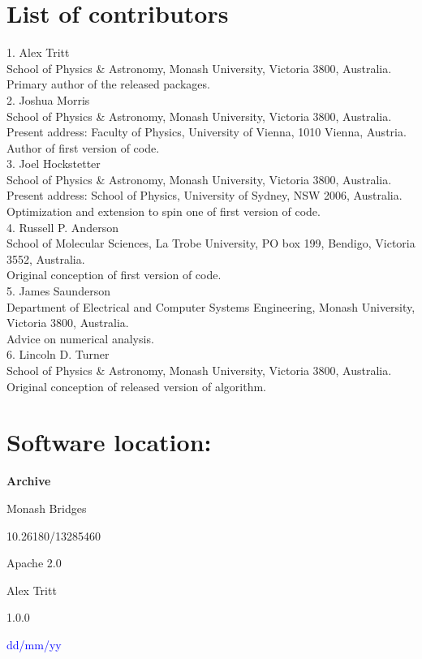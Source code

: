 \documentclass{jors}
\begin{document}
\section{List of contributors}

1. Alex Tritt\\
	School of Physics \& Astronomy, Monash University, Victoria 3800, Australia.\\
	Primary author of the released packages.\\
2. Joshua Morris\\
	School of Physics \& Astronomy, Monash University, Victoria 3800, Australia.\\
	Present address: Faculty of Physics, University of Vienna, 1010 Vienna, Austria.\\
	Author of first version of code.\\
3. Joel Hockstetter\\
	School of Physics \& Astronomy, Monash University, Victoria 3800, Australia.\\
	Present address: School of Physics, University of Sydney, NSW 2006, Australia.\\
	Optimization and extension to spin one of first version of code.\\
4. Russell P. Anderson\\
	School of Molecular Sciences, La Trobe University, PO box 199, Bendigo, Victoria 3552, Australia.\\
	Original conception of first version of code.\\
5. James Saunderson\\
	Department of Electrical and Computer Systems Engineering, Monash University, Victoria 3800, Australia.\\
	Advice on numerical analysis.\\
6. Lincoln D. Turner\\
	School of Physics \& Astronomy, Monash University, Victoria 3800, Australia.\\
	Original conception of released version of algorithm.

\section{Software location:}

{\bf Archive}

\begin{description}[noitemsep,topsep=0pt]
	\item[Name:] Monash Bridges
	\item[Persistent identifier:] 10.26180/13285460
	\item[Licence:] Apache 2.0
	\item[Publisher:]  Alex Tritt
	\item[Version published:] 1.0.0
	\item[Date published:] \textcolor{blue}{dd/mm/yy}
\end{description}
\end{document}
